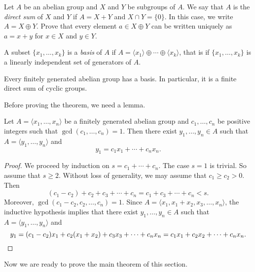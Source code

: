 \begin{exercise}
    Let $A$ be an abelian group and $X$ and $Y$ be subgroups of $A$. 
    We say that $A$ is the \emph{direct sum} of $X$ and $Y$ 
    if $A=X+Y$ and $X\cap Y=\{0\}$. In this case, we write $A=X\oplus Y$. Prove that 
    every element $a\in X\oplus Y$ can be
    written uniquely as $a=x+y$ for $x\in X$ and $y\in Y$.     
\end{exercise}

A subset $\{x_1,\dots,x_k\}$ is a \emph{basis} of $A$ 
if $A=\langle x_1\rangle\oplus\cdots\oplus \langle x_k\rangle$, that is
if $\{x_1,\dots,x_k\}$ is a 
linearly independent set of generators of $A$. 


\begin{theorem}
\label{thm:fundamental_abelian}
    Every finitely generated abelian group has a basis. In particular, 
    it is a finite direct sum of cyclic groups. 
\end{theorem}

Before proving the theorem, we need a lemma.

\begin{lemma}
\label{lem:trick_abelian}
    Let $A=\langle x_1,\dots,x_n\rangle$ be a finitely generated 
    abelian group and $c_1,\dots,c_n$ be positive integers such that 
    $\gcd(c_1,\dots,c_n)=1$. Then there exist $y_1,\dots,y_n\in A$ 
    such that 
    $A=\langle y_1,\dots,y_n\rangle$ and 
    \[ 
    y_1=c_1x_1+\cdots+c_nx_n.
    \]
\end{lemma}

\begin{proof}
    We proceed by induction on $s=c_1+\cdots+c_n$. The case $s=1$ is trivial. 
    So assume that $s\geq2$. Without loss of generality, we may assume that 
    $c_1\geq c_2>0$. Then 
    \[ 
    (c_1-c_2)+c_2+c_3+\cdots+c_n=c_1+c_3+\cdots+c_n<s.
    \]
    Moreover, $\gcd(c_1-c_2,c_2,\dots,c_n)=1$. Since $A=\langle x_1,x_1+x_2,x_3,\dots,x_n\rangle$, the inductive hypothesis implies that 
    there exist $y_1,\dots,y_n\in A$ such that 
    $A=\langle y_1,\dots,y_n\rangle$ and 
    \[ 
        y_1=(c_1-c_2)x_1+c_2(x_1+x_2)+c_3x_3+\cdots+c_nx_n
        =c_1x_1+c_2x_2+\cdots+c_nx_n.\qedhere
    \]
\end{proof}

Now we are ready to prove the main theorem of this section. 

